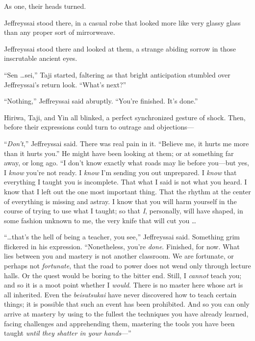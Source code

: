 {
 As one, their heads turned.}

{
 Jeffreyssai stood there, in a casual robe that looked more like
very glassy glass than any proper sort of mirrorweave.}

{
 Jeffreyssai stood there and looked at them, a strange abiding
sorrow in those inscrutable ancient eyes.}

{
 ``Sen \ldots sei,'' Taji
started, faltering as that bright anticipation stumbled over
Jeffreyssai's return look.
``What's next?''}

{
 ``Nothing,'' Jeffreyssai said
abruptly. ``You're finished.
It's done.''}

{
 Hiriwa, Taji, and Yin all blinked, a perfect synchronized gesture
of shock. Then, before their expressions could turn to outrage and
objections---}

{
 ``\textit{Don't},''
Jeffreyssai said. There was real pain in it. ``Believe
me, it hurts me more than it hurts you.'' He might
have been looking at them; or at something far away, or long ago.
``I don't know exactly what roads may
lie before you---but yes, I \textit{know} you're not
ready. I \textit{know} I'm sending you out unprepared.
I \textit{know} that everything I taught you is incomplete. That what I
said is not what you heard. I know that I left out the one most
important thing. That the rhythm at the center of everything is missing
and astray. I know that you will harm yourself in the course of trying
to use what I taught; so that \textit{I}, personally, will have shaped,
in some fashion unknown to me, the very knife that will cut you \ldots}

{
 ``\ldots that's the hell of being
a teacher, you see,'' Jeffreyssai said. Something
grim flickered in his expression. ``Nonetheless,
you're \textit{done}. Finished, for now. What lies
between you and mastery is not another classroom. We are fortunate, or
perhaps not \textit{fortunate}, that the road to power does not wend
only through lecture halls. Or the quest would be boring to the bitter
end. Still, I \textit{cannot} teach you; and so it is a moot point
whether I \textit{would}. There is no master here whose art is all
inherited. Even the \textit{beisutsukai} have never discovered how to
teach certain things; it is possible that such an event has been
prohibited. And so you can only arrive at mastery by using to the
fullest the techniques you have already learned, facing challenges and
apprehending them, mastering the tools you have been taught
\textit{until they shatter in your hands}{}---''}

